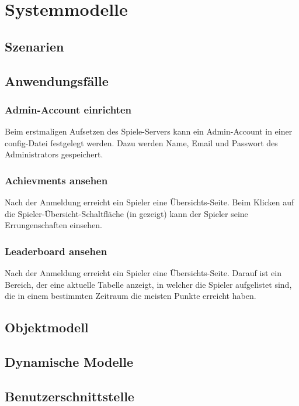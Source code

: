 \documentclass[a4paper]{scrreprt}
\begin{document}
\chapter{Systemmodelle}
\section{Szenarien}
\section{Anwendungsfälle}
    \subsection{Admin-Account einrichten}
    Beim erstmaligen Aufsetzen des \Gls{Spiele-Server}s kann ein Admin-Account in einer config-Datei festgelegt werden.
    Dazu werden Name, Email und Passwort des \Gls{Administrator}s gespeichert.
    \subsection{Achievments ansehen}
    Nach der Anmeldung erreicht ein \Gls{Spieler} eine Übersichts-Seite. Beim Klicken auf die Spieler-Übersicht-Schaltfläche
    (in  gezeigt) kann der \Gls{Spieler} seine Errungenschaften einsehen.
    \subsection{Leaderboard ansehen}
    Nach der Anmeldung erreicht ein \Gls{Spieler} eine Übersichts-Seite. Darauf ist ein Bereich, der eine aktuelle Tabelle
    anzeigt, in welcher die \Gls{Spieler} aufgelistet sind, die in einem bestimmten Zeitraum die meisten Punkte erreicht haben.

\section{Objektmodell}
\section{Dynamische Modelle}
\section{Benutzerschnittstelle}
\end{document}
